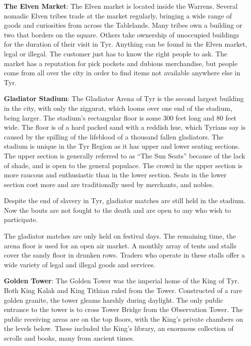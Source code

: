 {
	\textbf{The Elven Market}: The Elven market is located inside the Warrens. Several nomadic Elven tribes trade at the market regularly, bringing a wide range of goods and curiosities from across the Tablelands. Many tribes own a building or two that borders on the square. Others take ownership of unoccupied buildings for the duration of their visit in Tyr. Anything can be found in the Elven market, legal or illegal. The customer just has to know the right people to ask. The market has a reputation for pick pockets and dubious merchandise, but people come from all over the city in order to find items not available anywhere else in Tyr.

	\textbf{Gladiator Stadium}: The Gladiator Arena of Tyr is the second largest building in the city, with only the ziggurat, which looms over one end of the stadium, being larger. The stadium's rectangular floor is some 300 feet long and 80 feet wide. The floor is of a hard packed sand with a reddish hue, which Tyrians say is caused by the spilling of the lifeblood of a thousand fallen gladiators. The stadium is unique in the Tyr Region as it has upper and lower seating sections. The upper section is generally referred to as ``The Sun Seats'' because of the lack of shade, and is open to the general populace. The crowd in the upper section is more raucous and enthusiastic than in the lower section. Seats in the lower section cost more and are traditionally used by merchants, and nobles.

	Despite the end of slavery in Tyr, gladiator matches are still held in the stadium. Now the bouts are not fought to the death and are open to any who wish to participate.

	The gladiator matches are only held on festival days. The remaining time, the arena floor is used for an open air market. A monthly array of tents and stalls cover the sandy floor in drunken rows. Traders who operate in these stalls offer a wide variety of legal and illegal goods and services.

	\textbf{Golden Tower}: The Golden Tower was the imperial home of the King of Tyr. Both King Kalak and King Tithian ruled from the Tower. Constructed of a rare golden granite, the tower gleams harshly during daylight. The only public entrance to the tower is to cross Tower Bridge from the Observation Tower. The public receiving areas are on the top floors, with the King's private chambers on the levels below. These included the King's library, an enormous collection of scrolls and books, many from ancient times.

}
